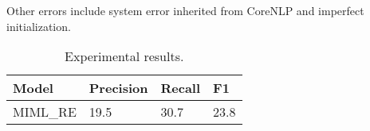 \documentclass[11pt,a4paper]{article}
\begin{document}
    Other errors include system error inherited from CoreNLP and imperfect initialization. 
\begin{table}[]\label{table:results}
\center
\caption{Experimental results.}
\begin{tabular}{|l|l|l|l|}
\hline
Model    & Precision & Recall & F1   \\ \hline
MIML\_RE & 19.5      & 30.7   & 23.8 \\ \hline
\end{tabular}
\end{table}
  
  
  
  
\end{document}
